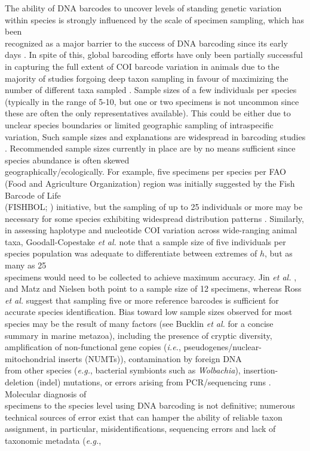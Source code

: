 The ability of DNA barcodes to uncover levels of standing genetic variation within species is strongly influenced by the scale of specimen sampling, which has been \\ recognized as a major barrier to the success of DNA barcoding since its early days  \cite{hebert2004identification, meyer2005dna, ward2005dna}. In spite of this, global barcoding efforts have only been partially successful in capturing the full extent of COI barcode variation in animals due to the majority of studies forgoing deep taxon sampling in favour of maximizing the number of different taxa sampled \cite{matz2005likelihood, zhang2010estimating}. Sample sizes of a few individuals per species (typically in the range of 5-10, but one or two specimens is not uncommon since these are often the only representatives available). This could be either due to unclear species boundaries  or limited geographic sampling of intraspecific variation, Such sample sizes and explanations are widespread in barcoding studies \cite{hajibabaei2007dna, matz2005likelihood, zhang2010estimating}. Recommended sample sizes currently in place are by no means sufficient since species abundance is often skewed \\ geographically/ecologically. For example, five specimens per species per FAO (Food and Agriculture Organization) region was initially suggested by the Fish Barcode of Life \\ (FISHBOL; \cite{ward2009campaign}) initiative, but the sampling of up to 25 individuals or more may be necessary for some species exhibiting widespread distribution patterns \cite{becker2011five, steinke2011fish}. Similarly, in assessing haplotype and nucleotide COI variation across wide-ranging animal taxa, Goodall-Copestake \textit{et al.} \cite{goodall2012comparison} note that a sample size of five individuals per species population was adequate to differentiate between extremes of $h$, but as many as 25 \\ specimens would need to be collected to achieve maximum accuracy. Jin \textit{et al.} \cite{jin2012simple}, and Matz and Nielsen \cite{matz2005likelihood} both point to a sample size of 12 specimens, whereas Ross \textit{et al.} \cite{ross2008testing} suggest that sampling five or more reference barcodes is sufficient for accurate species identification. Bias toward low sample sizes observed for most species may be the result of many factors (see Bucklin \textit{et al.} \cite{bucklin2011dna} for a concise summary in marine metazoa), including the presence of cryptic diversity, amplification of non-functional gene copies (\textit{i.e.}, pseudogenes/nuclear-mitochondrial inserts (NUMTs)), contamination by foreign DNA \\ from other species (\textit{e.g.}, bacterial symbionts such as \textit{Wolbachia}), insertion-deletion (indel) mutations, or errors arising from PCR/sequencing runs \cite{goodall2012comparison}.  Molecular diagnosis of \\ specimens to the species level using DNA barcoding is not  definitive; numerous technical sources of error exist that can hamper the ability of reliable taxon assignment, in particular, misidentifications, sequencing errors and lack of taxonomic metadata (\textit{e.g.}, 